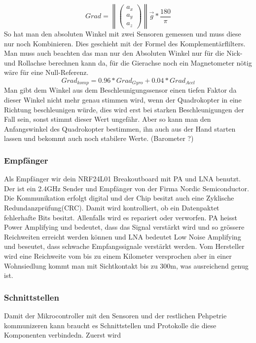 \documentclass[12pt,a4paper, ngerman]{article}
\begin{document}
\begin{equation}
Grad=
\left \|
\begin{pmatrix}
a_{x}\\ 
a_{y}\\ 
a_{z}
\end{pmatrix}
\right \|
\vec{g}*\frac{180}{\pi}
\end{equation}
So hat man den absoluten Winkel mit zwei Sensoren gemessen und muss diese nur noch Kombinieren. Dies geschieht mit der Formel des Komplementärflilters. Man muss auch beachten das man nur den Absoluten Winkel nur für die Nick-und Rollachse berechnen kann da, für die Gierachse noch ein Magnetometer nötig wäre für eine Null-Referenz.
\begin{equation}
Grad_{komp}=0.96*Grad_{Gyro}+0.04*Grad_{Accl}
\end{equation}
Man gibt dem Winkel aus dem Beschleunigungssensor einen tiefen Faktor da dieser Winkel nicht mehr genau stimmen wird, wenn der Quadrokopter in eine Richtung beschleunigen würde, dies wird erst bei starken Beschleunigungen der Fall sein, sonst stimmt dieser Wert ungefähr. Aber so kann man den Anfangswinkel des Quadrokopter bestimmen, ihn auch aus der Hand starten lassen und bekommt auch noch stabilere Werte. (Barometer ?) 

\subsubsection{Empfänger}
Als Empfänger wir dein NRF24L01 Breakoutboard mit PA und LNA benutzt. Der ist ein 2.4GHz Sender und Empfänger von der Firma Nordic Semiconductor. Die Kommunikation erfolgt digital und der Chip besitzt auch eine Zyklische Redundanzprüfung(CRC). Damit wird kontrolliert, ob ein Datenpaktet fehlerhafte Bits besitzt. Allenfalls wird es repariert oder verworfen. PA heisst Power Amplifying und bedeutet, dass das Signal verstärkt wird und so grössere Reichweiten erreicht werden können und LNA bedeutet Low Noise Amplifying und beseutet, dass schwache Empfangssignale verstärkt werden.\cite{website:electronics.stackexchange.com_WhatisPALNA} Vom Hersteller wird eine Reichweite vom bis zu einem Kilometer versprochen aber in einer Wohnsiedlung kommt man mit Sichtkontakt bis zu 300m, was ausreichend genug ist.

\subsubsection{Schnittstellen}
Damit der Mikrocontroller mit den Sensoren und der restlichen Pehpetrie kommunizeren kann braucht es Schnittstellen und Protokolle die diese Komponenten verbindedn. Zuerst wird 
\end{document}
